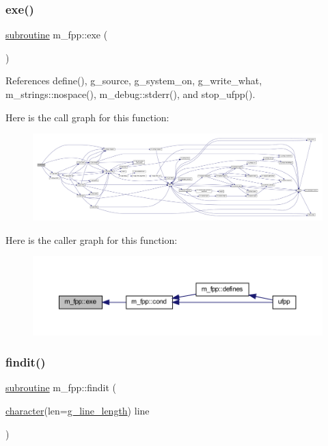 \subsubsection{\texorpdfstring{exe()}{exe()}}
{\footnotesize\ttfamily \hyperlink{M__stopwatch_83_8txt_acfbcff50169d691ff02d4a123ed70482}{subroutine} m\+\_\+fpp\+::exe (\begin{DoxyParamCaption}{ }\end{DoxyParamCaption})}



References define(), g\+\_\+source, g\+\_\+system\+\_\+on, g\+\_\+write\+\_\+what, m\+\_\+strings\+::nospace(), m\+\_\+debug\+::stderr(), and stop\+\_\+ufpp().

Here is the call graph for this function\+:
\nopagebreak
\begin{figure}[H]
\begin{center}
\leavevmode
\includegraphics[width=350pt]{namespacem__fpp_a1149aa9cc5620d40fa315e4de3937776_cgraph}
\end{center}
\end{figure}
Here is the caller graph for this function\+:
\nopagebreak
\begin{figure}[H]
\begin{center}
\leavevmode
\includegraphics[width=350pt]{namespacem__fpp_a1149aa9cc5620d40fa315e4de3937776_icgraph}
\end{center}
\end{figure}
\mbox{\label{namespacem__fpp_a53852a7bdeabe727148d17df3448caae}} 
\subsubsection{\texorpdfstring{findit()}{findit()}}
{\footnotesize\ttfamily \hyperlink{M__stopwatch_83_8txt_acfbcff50169d691ff02d4a123ed70482}{subroutine} m\+\_\+fpp\+::findit (\begin{DoxyParamCaption}\item[{\hyperlink{option__stopwatch_83_8txt_abd4b21fbbd175834027b5224bfe97e66}{character}(len=\hyperlink{namespacem__fpp_ab93f8756cf248cf8db932573009d4664}{g\+\_\+line\+\_\+length})}]{line }\end{DoxyParamCaption})}



